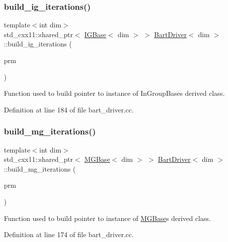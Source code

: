 \subsubsection{\texorpdfstring{build\+\_\+ig\+\_\+iterations()}{build\_ig\_iterations()}}
{\footnotesize\ttfamily template$<$int dim$>$ \\
std\+\_\+cxx11\+::shared\+\_\+ptr$<$ \hyperlink{class_i_g_base}{I\+G\+Base}$<$ dim $>$ $>$ \hyperlink{class_bart_driver}{Bart\+Driver}$<$ dim $>$\+::build\+\_\+ig\+\_\+iterations (\begin{DoxyParamCaption}\item[{const Parameter\+Handler \&}]{prm }\end{DoxyParamCaption})\hspace{0.3cm}{\ttfamily [private]}}



Function used to build pointer to instance of In\+Group\+Base\textquotesingle{}s derived class. 



Definition at line 184 of file bart\+\_\+driver.\+cc.

\mbox{\label{class_bart_driver_af0c96d5fe57cdb8df75e1fb93ce6196b}} 
\subsubsection{\texorpdfstring{build\+\_\+mg\+\_\+iterations()}{build\_mg\_iterations()}}
{\footnotesize\ttfamily template$<$int dim$>$ \\
std\+\_\+cxx11\+::shared\+\_\+ptr$<$ \hyperlink{class_m_g_base}{M\+G\+Base}$<$ dim $>$ $>$ \hyperlink{class_bart_driver}{Bart\+Driver}$<$ dim $>$\+::build\+\_\+mg\+\_\+iterations (\begin{DoxyParamCaption}\item[{const Parameter\+Handler \&}]{prm }\end{DoxyParamCaption})\hspace{0.3cm}{\ttfamily [private]}}



Function used to build pointer to instance of \hyperlink{class_m_g_base}{M\+G\+Base}\textquotesingle{}s derived class. 



Definition at line 174 of file bart\+\_\+driver.\+cc.

